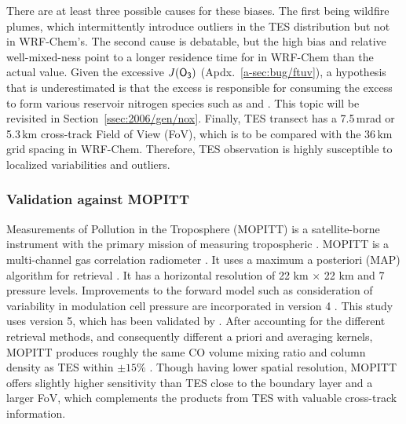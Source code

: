 There are at least three possible causes for these biases. The first being wildfire plumes, which intermittently introduce outliers in the TES distribution but not in WRF-Chem's.
The second cause is debatable, but the high bias and relative well-mixed-ness point to a longer residence time for  in WRF-Chem than the actual value. Given
the excessive $J(\chem{O_3})$ (Apdx.~\ref{a-sec:bug/ftuv}), a hypothesis that  is underestimated is that the excess {\lnox} is responsible for consuming the excess
 to form various reservoir nitrogen species such as  and . This topic will be revisited in Section~\ref{ssec:2006/gen/nox}. Finally,
TES transect has a 7.5\,\unit{mrad} or 5.3\,\unit{km} cross-track Field of View (FoV), which is to be compared with the 36\,\unit{km} grid spacing in WRF-Chem. Therefore, TES
observation is highly susceptible to localized variabilities and outliers.


\subsubsection{Validation against MOPITT}

Measurements of Pollution in the Troposphere (MOPITT) is a satellite-borne instrument with the primary mission of measuring tropospheric . MOPITT is a
multi-channel gas correlation radiometer \citep{Drummond:1996ve}. It uses a maximum a posteriori (MAP) algorithm for retrieval \citep{Deeter:2003bh}. It has a
horizontal resolution of 22 km $\times$ 22 km and 7 pressure levels. Improvements to the forward model such as consideration of variability in modulation cell pressure
are incorporated in version 4 \citep{Deeter:2010dq}. This study uses version 5, which has been validated by \citet{Deeter:2013fk}. After accounting for the different
retrieval methods, and consequently different a priori and averaging kernels, MOPITT produces roughly the same CO volume mixing ratio and column density as TES
within $\pm15\%$ \citep{Luo:2007ly}. Though having lower spatial resolution, MOPITT offers slightly higher sensitivity than TES close to the boundary layer and a larger
FoV, which complements the  products from TES with valuable cross-track information.

